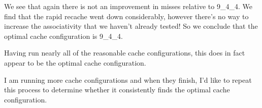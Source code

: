 We see that again there is not an improvement in misses relative to 9\_4\_4. 
We find that the rapid recache went down considerably, however there's no way to increase the associativity that we haven't already tested! So we conclude that the optimal cache configuration is 9\_4\_4.

Having run nearly all of the reasonable cache configurations, this does in fact appear to be the optimal cache configuration.

I am running more cache configurations and when they finish, I'd like to repeat this process to determine whether it consistently finds the optimal cache configuration.